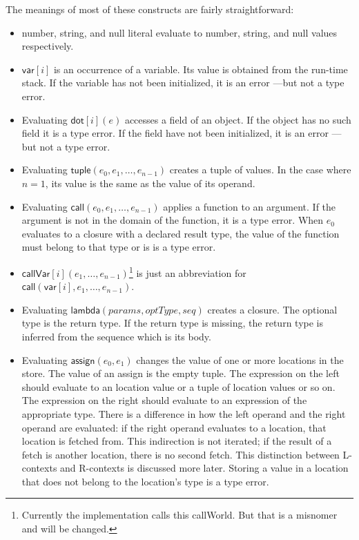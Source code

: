 \documentclass[12pt]{article}
\begin{document}
The meanings of most of these constructs are fairly straightforward:

\begin{itemize}
\item number, string, and null literal evaluate to number, string, and null
values respectively.

\item $\mathsf{var}[i]$ is an occurrence of a variable. Its value is
obtained from the run-time stack. If the variable has not been initialized,
it is an error ---but not a type error.

\item Evaluating $\mathsf{dot}\left[ i\right] (e)$ accesses a field of an
object. If the object has no such field it is a type error. If the field
have not been initialized, it is an error ---but not a type error.

\item Evaluating $\mathsf{tuple}\left( e_{0},e_{1},\ldots ,e_{n-1}\right) $
creates a tuple of values. In the case where $n=1$, its value is the same as
the value of its operand.

\item Evaluating $\mathsf{call}(e_{0},e_{1},\ldots ,e_{n-1})$ applies a
function to an argument. If the argument is not in the domain of the
function, it is a type error. When $e_{0}$ evaluates to a closure with a
declared result type, the value of the function must belong to that type or
is is a type error.

\item $\mathsf{callVar}[i](e_{1},\ldots ,e_{n-1})$\footnote{%
Currently the implementation calls this callWorld. But that is a misnomer
and will be changed.} is just an abbreviation for $\mathsf{call}(\mathsf{var}%
[i],e_{1},\ldots ,e_{n-1})$.

\item Evaluating $\mathsf{lambda}(\mathit{params},\mathit{optType,seq})$
creates a closure. The optional type is the return type. If the return type
is missing, the return type is inferred from the sequence which is its body.

\item Evaluating $\mathsf{assign}(e_{0},e_{1})$ changes the value of one or
more locations in the store. The value of an assign is the empty tuple. The
expression on the left should evaluate to an location value or a tuple of
location values or so on. The expression on the right should evaluate to an
expression of the appropriate type. There is a difference in how the left
operand and the right operand are evaluated: if the right operand evaluates
to a location, that location is fetched from. This indirection is not
iterated; if the result of a fetch is another location, there is no second
fetch. This distinction between L-contexts and R-contexts is discussed more
later. Storing a value in a location that does not belong to the location's
type is a type error.


\end{itemize}
\end{document}

